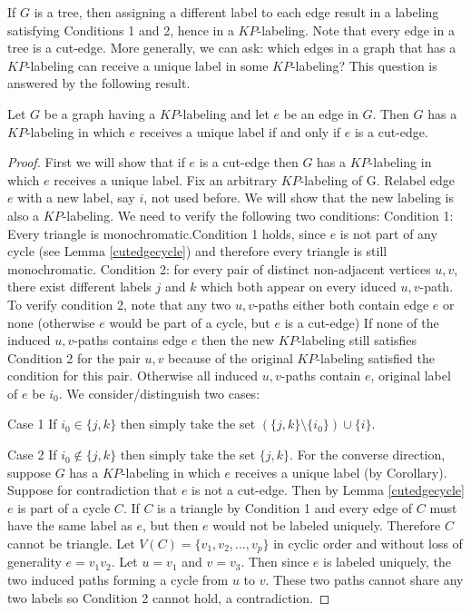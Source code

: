 \documentclass[12pt,a4paper,titlepage,openany]{report}
\begin{document}
If $G$ is a tree, then assigning a different label to each edge result in a labeling satisfying Conditions 1 and 2, hence in a $KP$-labeling. Note that every edge in a tree is a cut-edge. More generally, we can ask: which edges in a graph that has a $KP$-labeling can receive a unique label in some $KP$-labeling? This question is answered by the following result. 
\begin{proposition}
Let $G$ be a graph having a $KP$-labeling and let $e$ be an edge in $G$. Then $G$ has a $KP$-labeling in which $e$ receives a unique label if and only if $e$ is a cut-edge.
\end{proposition}

\begin{proof}
First we will show that if $e$ is a cut-edge then $G$ has a $KP$-labeling in which $e$ receives a unique label. Fix an arbitrary $KP$-labeling of G.\newline
Relabel edge $e$ with a new label, say $i$, not used before. We will show that the new labeling is also a $KP$-labeling. We need to verify the following two conditions:\newline
Condition 1: Every triangle is monochromatic.\newline Condition 1 holds, since $e$ is not part of any cycle (see Lemma \ref{cutedgecycle}) and therefore every triangle is still monochromatic.\newline
Condition 2: for every pair of distinct non-adjacent vertices $u,v$, there exist different labels $j$ and $k$ which both appear on every iduced $u,v$-path.\newline
To verify condition 2, note that any two $u,v$-paths either both contain edge $e$ or none (otherwise $e$ would be part of a cycle, but $e$ is a cut-edge)\newline
If none of the induced $u,v$-paths contains edge $e$ then the new $KP$-labeling still satisfies Condition 2 for the pair $u,v$ because of the original $KP$-labeling satisfied the condition for this pair.\newline
Otherwise all induced $u,v$-paths contain $e$, original label of $e$ be $i_0$. We consider/distinguish two cases:
\item[Case 1] If $i_0\in \{j,k\}$ then simply take the set $(\{j,k\}\setminus \{i_0\})\cup \{i\}$.
\item[Case 2] If $i_0\not\in \{j,k\}$ then simply take the set $\{j,k\}$.\newline
For the converse direction, suppose $G$ has a $KP$-labeling in which $e$ receives a unique label (by Corollary). Suppose for contradiction that $e$ is not a cut-edge. Then by Lemma \ref{cutedgecycle} $e$ is part of a cycle $C$. If $C$ is a triangle by Condition 1 and every edge of $C$ must have the same label as $e$, but then $e$ would not be labeled uniquely. Therefore $C$ cannot be triangle. 
Let $V(C)=\{v_1,v_2,...,v_p\}$ in cyclic order and without loss of generality $e=v_1v_2$. Let $u=v_1$ and $v=v_3$. Then since $e$ is labeled uniquely, the two induced paths forming a cycle from $u$ to $v$. These two paths cannot share any two labels so Condition 2 cannot hold, a contradiction. 
\end{proof}
\end{document}
